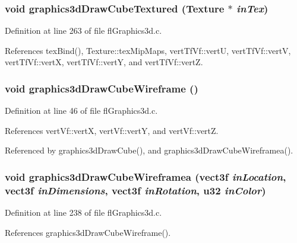 \subsubsection{\setlength{\rightskip}{0pt plus 5cm}void graphics3d\-Draw\-Cube\-Textured ({\bf Texture} $\ast$ {\em in\-Tex})}\label{flGraphics3d_8h_17894417032253bd513612931b2653bc}




Definition at line 263 of file fl\-Graphics3d.c.

References tex\-Bind(), Texture::tex\-Mip\-Maps, vert\-Tf\-Vf::vert\-U, vert\-Tf\-Vf::vert\-V, vert\-Tf\-Vf::vert\-X, vert\-Tf\-Vf::vert\-Y, and vert\-Tf\-Vf::vert\-Z.
\subsubsection{\setlength{\rightskip}{0pt plus 5cm}void graphics3d\-Draw\-Cube\-Wireframe ()}\label{flGraphics3d_8h_bb58801464c96ef8a95409f1ad292eb3}




Definition at line 46 of file fl\-Graphics3d.c.

References vert\-Vf::vert\-X, vert\-Vf::vert\-Y, and vert\-Vf::vert\-Z.

Referenced by graphics3d\-Draw\-Cube(), and graphics3d\-Draw\-Cube\-Wireframea().
\subsubsection{\setlength{\rightskip}{0pt plus 5cm}void graphics3d\-Draw\-Cube\-Wireframea ({\bf vect3f} {\em in\-Location}, {\bf vect3f} {\em in\-Dimensions}, {\bf vect3f} {\em in\-Rotation}, u32 {\em in\-Color})}\label{flGraphics3d_8h_e30ad6cfdb58334a287b0400a0ebf38f}




Definition at line 238 of file fl\-Graphics3d.c.

References graphics3d\-Draw\-Cube\-Wireframe().

